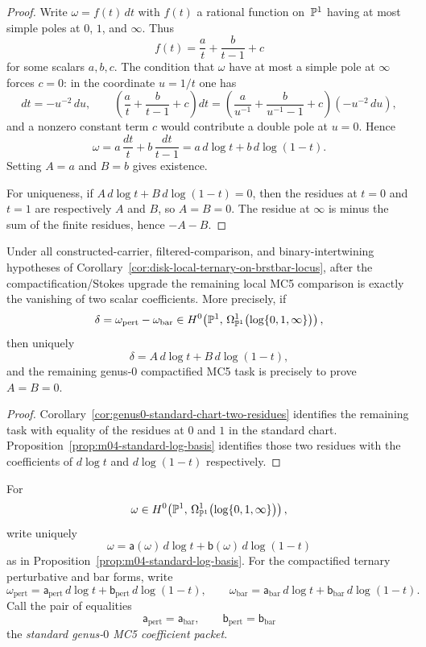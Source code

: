 \begin{proof}
Write $\omega = f(t)\,dt$ with $f(t)$ a rational function on~$\mathbb{P}^1$
having at most simple poles at $0$, $1$, and $\infty$.
Thus
\[
f(t)=\frac{a}{t}+\frac{b}{t-1}+c
\]
for some scalars $a,b,c$.  The condition that $\omega$ have at most a
simple pole at $\infty$ forces $c=0$: in the coordinate $u=1/t$ one
has
\[
dt = -u^{-2}\,du,\qquad
\left(\frac{a}{t}+\frac{b}{t-1}+c\right)dt
= \left(\frac{a}{u^{-1}}+\frac{b}{u^{-1}-1}+c\right)(-u^{-2}\,du),
\]
and a nonzero constant term $c$ would contribute a double pole at
$u=0$.
Hence
\[
\omega = a\,\frac{dt}{t}+b\,\frac{dt}{t-1}
= a\, d\log t + b\, d\log(1-t).
\]
Setting $A=a$ and $B=b$ gives existence.

For uniqueness, if
$A\, d\log t + B\, d\log(1-t)=0$, then the residues at
$t=0$ and $t=1$ are respectively $A$ and $B$, so $A=B=0$.
The residue at $\infty$ is minus the sum of the finite residues, hence
$-A-B$.
\end{proof}

\begin{corollary}
\label{cor:genus0-two-coefficient-packet}
Under all constructed-carrier, filtered-comparison, and binary-intertwining hypotheses of Corollary~\ref{cor:disk-local-ternary-on-brstbar-locus}, after the compactification/Stokes
upgrade the remaining local MC5 comparison is exactly the vanishing of
two scalar coefficients.  More precisely, if
\[
\delta = \omega_{\mathrm{pert}} - \omega_{\mathrm{bar}}
\in H^0\!\left(\mathbb{P}^1,\,
\Omega^1_{\mathbb{P}^1}\bigl(\log\{0,1,\infty\}\bigr)\right),
\]
then uniquely
\[
\delta = A\, d\log t + B\, d\log(1-t),
\]
and the remaining genus-$0$ compactified MC5 task is precisely to prove
$A=B=0$.
\end{corollary}

\begin{proof}
Corollary~\ref{cor:genus0-standard-chart-two-residues} identifies the
remaining task with equality of the residues at $0$ and $1$ in the
standard chart.  Proposition~\ref{prop:m04-standard-log-basis}
identifies those two residues with the coefficients of
$d\log t$ and $d\log(1-t)$ respectively.
\end{proof}

\begin{definition}
\label{def:genus0-mc5-coefficient-packet}
For
\[
\omega \in H^0\!\left(\mathbb{P}^1,\,
\Omega^1_{\mathbb{P}^1}\bigl(\log\{0,1,\infty\}\bigr)\right),
\]
write uniquely
\[
\omega=\mathsf{a}(\omega)\,d\log t+\mathsf{b}(\omega)\,d\log(1-t)
\]
as in Proposition~\ref{prop:m04-standard-log-basis}.  For the
compactified ternary perturbative and bar forms, write
\[
\omega_{\mathrm{pert}}
= \mathsf{a}_{\mathrm{pert}}\,d\log t
  + \mathsf{b}_{\mathrm{pert}}\,d\log(1-t),
\qquad
\omega_{\mathrm{bar}}
= \mathsf{a}_{\mathrm{bar}}\,d\log t
  + \mathsf{b}_{\mathrm{bar}}\,d\log(1-t).
\]
Call the pair of equalities
\[
\mathsf{a}_{\mathrm{pert}}=\mathsf{a}_{\mathrm{bar}},
\qquad
\mathsf{b}_{\mathrm{pert}}=\mathsf{b}_{\mathrm{bar}}
\]
the \emph{standard genus-$0$ MC5 coefficient packet}.
\end{definition}

